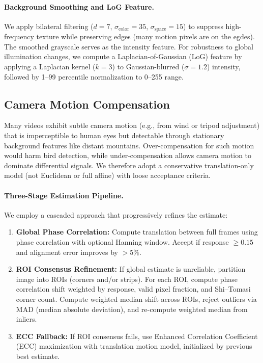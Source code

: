\paragraph{Background Smoothing and LoG Feature.}
We apply bilateral filtering ($d=7$, $\sigma_{\text{color}}=35$, $\sigma_{\text{space}}=15$) to suppress high-frequency texture while preserving edges (many motion pixels are on the egdes). The smoothed grayscale serves as the intensity feature. For robustness to global illumination changes, we compute a Laplacian-of-Gaussian (LoG) feature by applying a Laplacian kernel ($k=3$) to Gaussian-blurred ($\sigma=1.2$) intensity, followed by 1–99 percentile normalization to 0–255 range.

\subsection{Camera Motion Compensation}
\label{sec:camera_motion_comp}

Many videos exhibit subtle camera motion (e.g., from wind or tripod adjustment) that is imperceptible to human eyes but detectable through stationary background features like distant mountains. Over-compensation for such motion would harm bird detection, while under-compensation allows camera motion to dominate differential signals. We therefore adopt a conservative translation-only model (not Euclidean or full affine) with loose acceptance criteria.

\paragraph{Three-Stage Estimation Pipeline.}
We employ a cascaded approach that progressively refines the estimate:
\begin{enumerate}
    \item \textbf{Global Phase Correlation:} Compute translation between full frames using phase correlation with optional Hanning window. Accept if response $\geq 0.15$ and alignment error improves by $>5\%$.
    \item \textbf{ROI Consensus Refinement:} If global estimate is unreliable, partition image into ROIs (corners and/or strips). For each ROI, compute phase correlation shift weighted by response, valid pixel fraction, and Shi–Tomasi corner count. Compute weighted median shift across ROIs, reject outliers via MAD (median absolute deviation), and re-compute weighted median from inliers.
    \item \textbf{ECC Fallback:} If ROI consensus fails, use Enhanced Correlation Coefficient (ECC) maximization with translation motion model, initialized by previous best estimate.
\end{enumerate}

